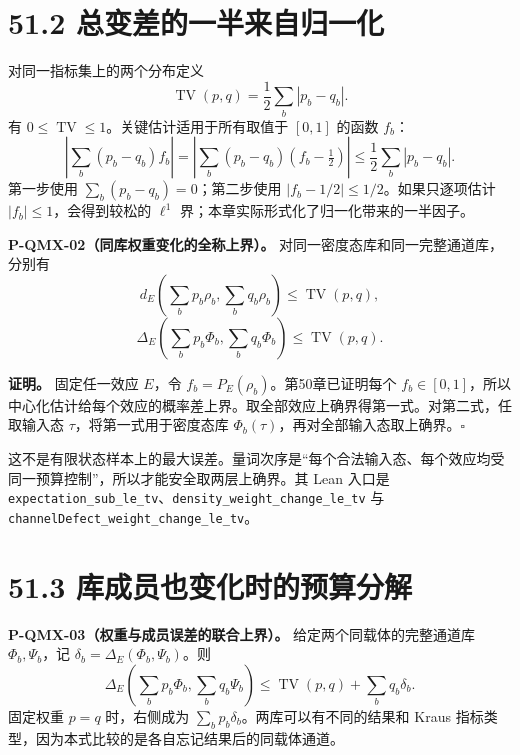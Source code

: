 \documentclass[
  11pt,
  oneside]{book}
\begin{document}
\hypertarget{ux603bux53d8ux5deeux7684ux4e00ux534aux6765ux81eaux5f52ux4e00ux5316}{%
\section{51.2
总变差的一半来自归一化}\label{ux603bux53d8ux5deeux7684ux4e00ux534aux6765ux81eaux5f52ux4e00ux5316}}

对同一指标集上的两个分布定义 \[
\operatorname{TV}(p,q)=\frac12\sum_b|p_b-q_b|.
\] 有 \(0\le\operatorname{TV}\le1\)。关键估计适用于所有取值于 \([0,1]\)
的函数 \(f_b\)： \[
\left|\sum_b(p_b-q_b)f_b\right|
=\left|\sum_b(p_b-q_b)(f_b-\tfrac12)\right|
\le\frac12\sum_b|p_b-q_b|.
\] 第一步使用 \(\sum_b(p_b-q_b)=0\)；第二步使用
\(|f_b-1/2|\le1/2\)。如果只逐项估计 \(|f_b|\le1\)，会得到较松的
\(\ell^1\) 界；本章实际形式化了归一化带来的一半因子。

\protect\hypertarget{p-qmx-02}{}{}

\textbf{P-QMX-02（同库权重变化的全称上界）。}
对同一密度态库和同一完整通道库，分别有 \[
d_E\left(\sum_b p_b\rho_b,\sum_b q_b\rho_b\right)
\le\operatorname{TV}(p,q),
\] \[
\Delta_E\left(\sum_b p_b\Phi_b,\sum_b q_b\Phi_b\right)
\le\operatorname{TV}(p,q).
\]

\textbf{证明。} 固定任一效应 \(E\)，令
\(f_b=P_E(\rho_b)\)。第50章已证明每个
\(f_b\in[0,1]\)，所以中心化估计给每个效应的概率差上界。取全部效应上确界得第一式。对第二式，任取输入态
\(\tau\)，将第一式用于密度态库
\(\Phi_b(\tau)\)，再对全部输入态取上确界。\(\square\)

这不是有限状态样本上的最大误差。量词次序是``每个合法输入态、每个效应均受同一预算控制''，所以才能安全取两层上确界。其
Lean 入口是
\texttt{expectation\_\allowbreak sub\_\allowbreak le\_\allowbreak tv}、\allowbreak \texttt{density\_\allowbreak weight\_\allowbreak change\_\allowbreak le\_\allowbreak tv}
与 \texttt{channelDefect\_\allowbreak weight\_\allowbreak change\_\allowbreak le\_\allowbreak tv}。

\hypertarget{ux5e93ux6210ux5458ux4e5fux53d8ux5316ux65f6ux7684ux9884ux7b97ux5206ux89e3}{%
\section{51.3
库成员也变化时的预算分解}\label{ux5e93ux6210ux5458ux4e5fux53d8ux5316ux65f6ux7684ux9884ux7b97ux5206ux89e3}}

\protect\hypertarget{p-qmx-03}{}{}

\textbf{P-QMX-03（权重与成员误差的联合上界）。}
给定两个同载体的完整通道库 \(\Phi_b,\Psi_b\)，记
\(\delta_b=\Delta_E(\Phi_b,\Psi_b)\)。则 \[
\Delta_E\left(\sum_b p_b\Phi_b,\sum_b q_b\Psi_b\right)
\le\operatorname{TV}(p,q)+\sum_b q_b\delta_b.
\] 固定权重 \(p=q\) 时，右侧成为
\(\sum_b p_b\delta_b\)。两库可以有不同的结果和 Kraus
指标类型，因为本式比较的是各自忘记结果后的同载体通道。
\end{document}
